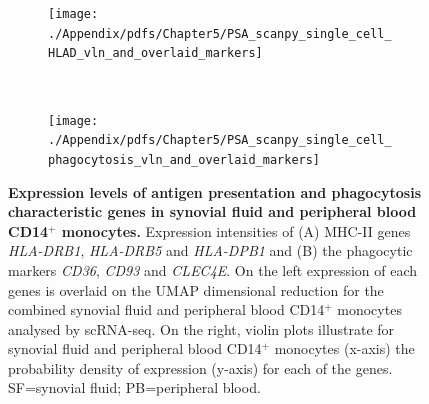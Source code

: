 \bigskip
\begin{figure}[ht]
\centering
\begin{subfigure}[b]{0.48\textwidth}
\centering 
\texttt{[image: ./Appendix/pdfs/Chapter5/PSA\_scanpy\_single\_cell\_HLAD\_vln\_and\_overlaid\_markers]}
\caption{}
\end{subfigure}%
~
\begin{subfigure}[b]{0.48\textwidth} 
\centering
\texttt{[image: ./Appendix/pdfs/Chapter5/PSA\_scanpy\_single\_cell\_phagocytosis\_vln\_and\_overlaid\_markers]}
\caption{}
\end{subfigure}
\caption[Expression levels of antigen presentation and phagocytosis characteristic genes in synovial fluid and peripheral blood CD14$^+$ monocytes.]{\textbf{Expression levels of antigen presentation and phagocytosis characteristic genes in synovial fluid and peripheral blood CD14$^+$ monocytes.} Expression intensities of (A) MHC-II genes \textit{HLA-DRB1}, \textit{HLA-DRB5} and \textit{HLA-DPB1} and (B) the phagocytic markers \textit{CD36}, \textit{CD93} and \textit{CLEC4E}. On the left expression of each genes is overlaid on the UMAP dimensional reduction for the combined synovial fluid and peripheral blood CD14$^+$ monocytes analysed by scRNA-seq. On the right, violin plots illustrate for synovial fluid and peripheral blood CD14$^+$ monocytes (x-axis) the probability density of expression (y-axis) for each of the genes. SF=synovial fluid; PB=peripheral blood.}
\label{figure:PsA_scRNAseq_ag_presentation_phagocytosis}
\end{figure}




